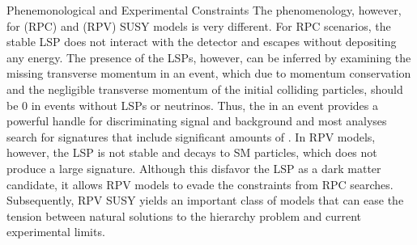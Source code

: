 \begin{section}{Phenemonological and Experimental Constraints}
The phenomenology, however, for \RPC (RPC) and \RPV (RPV) SUSY models is very different.
For RPC scenarios, the stable LSP does not interact with the detector and escapes without depositing any energy.
The presence of the LSPs, however, can be inferred by examining the missing transverse momentum in an event, which due to momentum conservation and the negligible transverse momentum of the initial colliding particles, should be 0 in events without LSPs or neutrinos.
Thus, the \MET in an event provides a powerful handle for discriminating signal and background and most analyses search for signatures that include significant amounts of \MET.
In RPV models, however, the LSP is not stable and decays to SM particles, which does not produce a large \MET signature.
Although this disfavor the LSP as a dark matter candidate, it allows RPV models to evade the constraints from RPC searches.
Subsequently, RPV SUSY yields an important class of models that can ease the tension between natural solutions to the hierarchy problem and current experimental limits.

\end{section}

